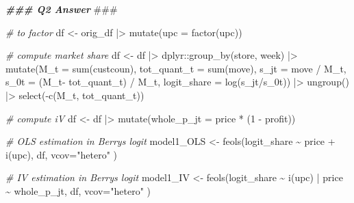 \documentclass[
]{article}
\newenvironment{Shaded}{\begin{snugshade}}{\end{snugshade}}
\newcommand{\AlertTok}[1]{\textcolor[rgb]{0.94,0.16,0.16}{#1}}
\newcommand{\AttributeTok}[1]{\textcolor[rgb]{0.77,0.63,0.00}{#1}}
\newcommand{\CommentTok}[1]{\textcolor[rgb]{0.56,0.35,0.01}{\textit{#1}}}
\newcommand{\DecValTok}[1]{\textcolor[rgb]{0.00,0.00,0.81}{#1}}
\newcommand{\DocumentationTok}[1]{\textcolor[rgb]{0.56,0.35,0.01}{\textbf{\textit{#1}}}}
\newcommand{\FunctionTok}[1]{\textcolor[rgb]{0.00,0.00,0.00}{#1}}
\newcommand{\NormalTok}[1]{#1}
\newcommand{\OtherTok}[1]{\textcolor[rgb]{0.56,0.35,0.01}{#1}}
\newcommand{\SpecialCharTok}[1]{\textcolor[rgb]{0.00,0.00,0.00}{#1}}
\newcommand{\StringTok}[1]{\textcolor[rgb]{0.31,0.60,0.02}{#1}}
\begin{document}
\begin{Shaded}
\begin{Highlighting}[]
\DocumentationTok{\#\#\# Q2 Answer }\AlertTok{\#\#\#}

\CommentTok{\# to factor}
\NormalTok{df }\OtherTok{\textless{}{-}}\NormalTok{ orig\_df }\SpecialCharTok{|\textgreater{}}
  \FunctionTok{mutate}\NormalTok{(}\AttributeTok{upc =} \FunctionTok{factor}\NormalTok{(upc))}

\CommentTok{\# compute market share}
\NormalTok{df }\OtherTok{\textless{}{-}}\NormalTok{ df }\SpecialCharTok{|\textgreater{}}
\NormalTok{  dplyr}\SpecialCharTok{::}\FunctionTok{group\_by}\NormalTok{(store, week) }\SpecialCharTok{|\textgreater{}}
  \FunctionTok{mutate}\NormalTok{(}\AttributeTok{M\_t =} \FunctionTok{sum}\NormalTok{(custcoun),}
         \AttributeTok{tot\_quant\_t =} \FunctionTok{sum}\NormalTok{(move),}
         \AttributeTok{s\_jt =}\NormalTok{ move }\SpecialCharTok{/}\NormalTok{ M\_t,}
         \AttributeTok{s\_0t =}\NormalTok{ (M\_t}\SpecialCharTok{{-}}\NormalTok{ tot\_quant\_t) }\SpecialCharTok{/}\NormalTok{ M\_t,}
         \AttributeTok{logit\_share =} \FunctionTok{log}\NormalTok{(s\_jt}\SpecialCharTok{/}\NormalTok{s\_0t)) }\SpecialCharTok{|\textgreater{}}
  \FunctionTok{ungroup}\NormalTok{() }\SpecialCharTok{|\textgreater{}}
  \FunctionTok{select}\NormalTok{(}\SpecialCharTok{{-}}\FunctionTok{c}\NormalTok{(M\_t, tot\_quant\_t))}

\CommentTok{\# compute iV}
\NormalTok{df }\OtherTok{\textless{}{-}}\NormalTok{ df }\SpecialCharTok{|\textgreater{}}
  \FunctionTok{mutate}\NormalTok{(}\AttributeTok{whole\_p\_jt =}\NormalTok{ price }\SpecialCharTok{*}\NormalTok{ (}\DecValTok{1} \SpecialCharTok{{-}}\NormalTok{ profit))}

\CommentTok{\# OLS estimation in Berry\textquotesingle{}s logit}
\NormalTok{model1\_OLS }\OtherTok{\textless{}{-}} \FunctionTok{feols}\NormalTok{(logit\_share }\SpecialCharTok{\textasciitilde{}}\NormalTok{  price }\SpecialCharTok{+} \FunctionTok{i}\NormalTok{(upc), }
\NormalTok{               df, }\AttributeTok{vcov=}\StringTok{"hetero"}
\NormalTok{)}

\CommentTok{\# IV estimation in Berry\textquotesingle{}s logit}
\NormalTok{model1\_IV }\OtherTok{\textless{}{-}} \FunctionTok{feols}\NormalTok{(logit\_share }\SpecialCharTok{\textasciitilde{}}  \FunctionTok{i}\NormalTok{(upc) }\SpecialCharTok{|}\NormalTok{ price }\SpecialCharTok{\textasciitilde{}}\NormalTok{ whole\_p\_jt, }
\NormalTok{               df, }\AttributeTok{vcov=}\StringTok{"hetero"}
\NormalTok{)}


\end{Highlighting}
\end{Shaded}
\end{document}
